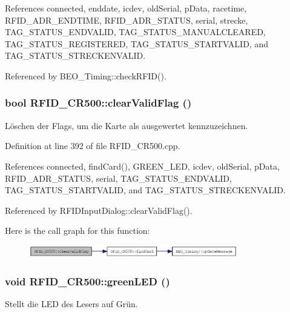 References connected, enddate, icdev, oldSerial, pData, racetime, RFID\_\-ADR\_\-ENDTIME, RFID\_\-ADR\_\-STATUS, serial, strecke, TAG\_\-STATUS\_\-ENDVALID, TAG\_\-STATUS\_\-MANUALCLEARED, TAG\_\-STATUS\_\-REGISTERED, TAG\_\-STATUS\_\-STARTVALID, and TAG\_\-STATUS\_\-STRECKENVALID.

Referenced by BEO\_\-Timing::checkRFID().\hypertarget{class_r_f_i_d___c_r500_2062849e5d875fb74e71c631468e40c1}{
\subsubsection[clearValidFlag]{\setlength{\rightskip}{0pt plus 5cm}bool RFID\_\-CR500::clearValidFlag ()}}
\label{class_r_f_i_d___c_r500_2062849e5d875fb74e71c631468e40c1}


Löschen der Flags, um die Karte als ausgewertet kennzuzeichnen. 



Definition at line 392 of file RFID\_\-CR500.cpp.

References connected, findCard(), GREEN\_\-LED, icdev, oldSerial, pData, RFID\_\-ADR\_\-STATUS, serial, TAG\_\-STATUS\_\-ENDVALID, TAG\_\-STATUS\_\-STARTVALID, and TAG\_\-STATUS\_\-STRECKENVALID.

Referenced by RFIDInputDialog::clearValidFlag().

Here is the call graph for this function:\nopagebreak
\begin{figure}[H]
\begin{center}
\leavevmode
\includegraphics[width=258pt]{class_r_f_i_d___c_r500_2062849e5d875fb74e71c631468e40c1_cgraph}
\end{center}
\end{figure}
\hypertarget{class_r_f_i_d___c_r500_c72b02ffc4c4b42cfdb97fbed3a2eb97}{
\subsubsection[greenLED]{\setlength{\rightskip}{0pt plus 5cm}void RFID\_\-CR500::greenLED ()}}
\label{class_r_f_i_d___c_r500_c72b02ffc4c4b42cfdb97fbed3a2eb97}


Stellt die LED des Lesers auf Grün. 



